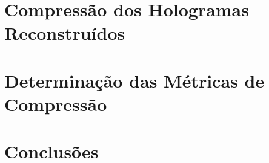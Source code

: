 \section{Compressão dos Hologramas Reconstruídos}
\lipsum[1]

\section{Determinação das Métricas de Compressão}
\lipsum[1]








\section{Conclusões}
\label{chap4:sec:concs}
